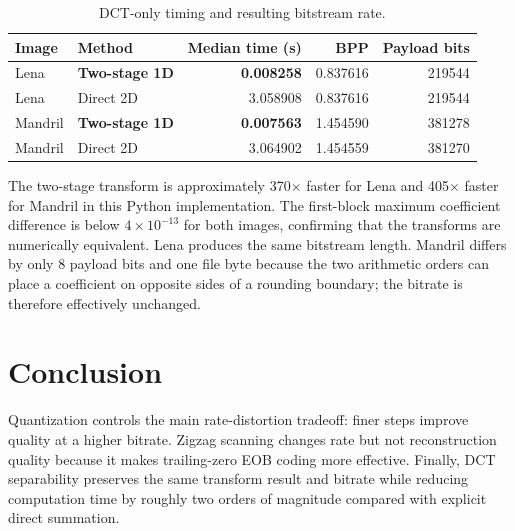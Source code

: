 \documentclass[10pt,a4paper]{article}
\begin{document}
\begin{table}[ht]
\centering
\small
\begin{tabular}{llrrr}
\toprule
Image & Method & Median time (s) & BPP & Payload bits \\
\midrule
Lena    & \textbf{Two-stage 1D} & \textbf{0.008258} & 0.837616 & 219544 \\
Lena    & Direct 2D    & 3.058908 & 0.837616 & 219544 \\
\midrule
Mandril & \textbf{Two-stage 1D} & \textbf{0.007563} & 1.454590 & 381278 \\
Mandril & Direct 2D    & 3.064902 & 1.454559 & 381270 \\
\bottomrule
\end{tabular}
\caption{DCT-only timing and resulting bitstream rate.}
\end{table}

The two-stage transform is approximately 370$\times$ faster for Lena and 405$\times$ faster for Mandril in this Python implementation. The first-block maximum coefficient difference is below $4\times10^{-13}$ for both images, confirming that the transforms are numerically equivalent. Lena produces the same bitstream length. Mandril differs by only 8 payload bits and one file byte because the two arithmetic orders can place a coefficient on opposite sides of a rounding boundary; the bitrate is therefore effectively unchanged.

\section{Conclusion}

Quantization controls the main rate-distortion tradeoff: finer steps improve quality at a higher bitrate. Zigzag scanning changes rate but not reconstruction quality because it makes trailing-zero EOB coding more effective. Finally, DCT separability preserves the same transform result and bitrate while reducing computation time by roughly two orders of magnitude compared with explicit direct summation.
\end{document}
